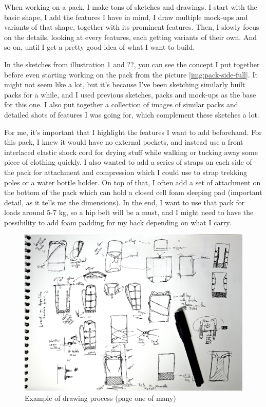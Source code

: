 
When working on a pack, I make tons of sketches and drawings. I start with the basic shape, I add the features I have in mind, I draw multiple mock-ups and variants of that shape, together with its prominent features. Then, I slowly focus on the details, looking at every features, each getting variants of their own. And so on, until I get a pretty good idea of what I want to build.

In the sketches from illustration \ref{img:design-drawings} and ??, you can see the concept I put together before even starting working on the pack from the picture \ref{img:pack-side-full}. It might not seem like a lot, but it's because I've been sketching similarly built packs for a while, and I used previous sketches, packs and mock-ups as the base for this one. I also put together a collection of images of similar packs and detailed shots of features I was going for, which complement these sketches a lot.

For me, it's important that I highlight the features I want to add beforehand. For this pack, I knew it would have no external pockets, and instead use a front interlaced elastic shock cord for drying stuff while walking or tucking away some piece of clothing quickly. I also wanted to add a series of straps on each side of the pack for attachment and compression which I could use to strap trekking poles or a water bottle holder. On top of that, I often add a set of attachment on the bottom of the pack which can hold a closed cell foam sleeping pad (important detail, as it tells me the dimensions). In the end, I want to use that pack for loads around 5-7 kg, so a hip belt will be a must, and I might need to have the possibility to add foam padding for my back depending on what I carry.

\begin{figure}[ht]
  \includegraphics[width=\textwidth]{media/images/design-drawings}
  \caption{Example of drawing process (page one of many)}
  \label{img:design-drawings}
\end{figure}

